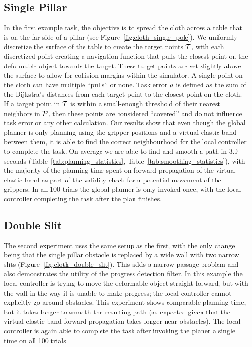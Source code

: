 \subsection{Single Pillar}
\label{sec:single_pillar}

In the first example task, the objective is to spread the cloth across a table that is on the far side  of a pillar (see Figure~\ref{fig:cloth_single_pole}). We uniformly discretize the surface of the table to create the target points $\mathcal{T}$, with each discretized point creating a navigation function that pulls the closest point on the deformable object towards the target. These target points are set slightly above the surface to allow for collision margins within the simulator. A single point on the cloth can have multiple ``pulls'' or none. Task error $\rho$ is defined as the sum of the Dijkstra's distances from each target point to the closest point on the cloth. If a target point in $\mathcal{T}$ is within a small-enough threshold of their nearest neighbors in $\mathcal{P}$, then these points are considered ``covered'' and do not influence task error or any other calculation. Our results show that even though the global planner is only planning using the gripper positions and a virtual elastic band between them, it is able to find the correct neighbourhood for the local controller to complete the task. On average we are able to find and smooth a path in 3.0 seconds (Table~\ref{tab:planning_statistics}, Table~\ref{tab:smoothing_statistics}), with the majority of the planning time spent on forward propagation of the virtual elastic band as part of the validity check for a potential movement of the grippers. In all 100 trials the global planner is only invoked once, with the local controller completing the task after the plan finishes.


\subsection{Double Slit}
\label{sec:double_slit}
The second experiment uses the same setup as the first, with the only change being that the single pillar obstacle is replaced by a wide wall with two narrow slits (Figure~\ref{fig:cloth_double_slit}). This adds a narrow passage problem and also demonstrates the utility of the progress detection filter. In this example the local controller is trying to move the deformable object straight forward, but with the wall in the way it is unable to make progress; the local controller cannot explicitly go around obstacles. This experiment shows comparable planning time, but it takes longer to smooth the resulting path (as expected given that the virtual elastic band forward propagation takes longer near obstacles). The local controller is again able to complete the task after invoking the planer a single time on all 100 trials.



